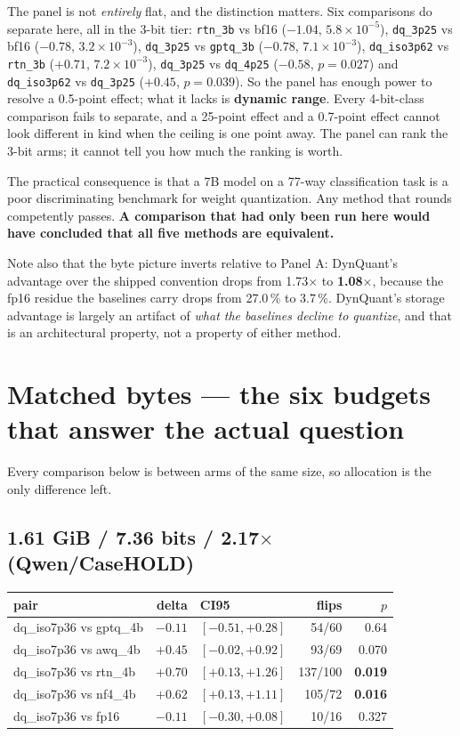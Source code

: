 \documentclass[11pt]{article}
\newcommand{\x}{\texorpdfstring{$\times$}{x}}
\newcommand{\pct}{\,\%}
\newcommand{\code}[1]{\texttt{#1}}
\newcommand{\e}[2]{$#1\!\times\!10^{#2}$}
\newcommand{\best}[1]{\textbf{#1}}
\begin{document}
The panel is not \emph{entirely} flat, and the distinction matters. Six comparisons do separate
here, all in the 3-bit tier: \code{rtn\_3b} vs bf16 ($-1.04$, \e{5.8}{-5}), \code{dq\_3p25} vs
bf16 ($-0.78$, \e{3.2}{-3}), \code{dq\_3p25} vs \code{gptq\_3b} ($-0.78$, \e{7.1}{-3}),
\code{dq\_iso3p62} vs \code{rtn\_3b} ($+0.71$, \e{7.2}{-3}), \code{dq\_3p25} vs \code{dq\_4p25}
($-0.58$, $p = 0.027$) and \code{dq\_iso3p62} vs \code{dq\_3p25} ($+0.45$, $p = 0.039$). So the
panel has enough power to resolve a 0.5-point effect; what it lacks is \textbf{dynamic range}.
Every 4-bit-class comparison fails to separate, and a 25-point effect and a 0.7-point effect
cannot look different in kind when the ceiling is one point away. The panel can rank the 3-bit
arms; it cannot tell you how much the ranking is worth.

The practical consequence is that a 7B model on a 77-way classification task is a poor
discriminating benchmark for weight quantization. Any method that rounds competently passes.
\textbf{A comparison that had only been run here would have concluded that all five methods are
equivalent.}

Note also that the byte picture inverts relative to Panel A: DynQuant's advantage over the
shipped convention drops from 1.73\x{} to \textbf{1.08\x}, because the fp16 residue the baselines
carry drops from 27.0\pct{} to 3.7\pct. DynQuant's storage advantage is largely an artifact of
\emph{what the baselines decline to quantize}, and that is an architectural property, not a
property of either method.

\section{Matched bytes --- the six budgets that answer the actual question}

Every comparison below is between arms of the same size, so allocation is the only difference
left.

\subsection{1.61 GiB / 7.36 bits / 2.17\x{} (Qwen/CaseHOLD)}

\begin{center}\small
\begin{tabular}{@{}lrlrr@{}}
\toprule
pair & delta & CI95 & flips & $p$ \\
\midrule
dq\_iso7p36 vs gptq\_4b & $-0.11$ & $[-0.51, +0.28]$ & 54/60 & 0.64 \\
dq\_iso7p36 vs awq\_4b & $+0.45$ & $[-0.02, +0.92]$ & 93/69 & 0.070 \\
dq\_iso7p36 vs rtn\_4b & \best{$+0.70$} & $[+0.13, +1.26]$ & 137/100 & \best{0.019} \\
dq\_iso7p36 vs nf4\_4b & \best{$+0.62$} & $[+0.13, +1.11]$ & 105/72 & \best{0.016} \\
dq\_iso7p36 vs fp16 & $-0.11$ & $[-0.30, +0.08]$ & 10/16 & 0.327 \\
\bottomrule
\end{tabular}
\end{center}
\end{document}
